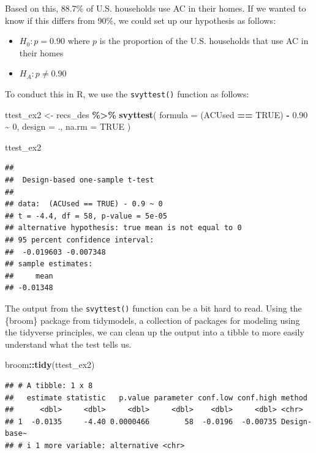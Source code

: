 \documentclass[
]{krantz}
\makeatletter
\newenvironment{Shaded}{\begin{snugshade}}{\end{snugshade}}
\newcommand{\AttributeTok}[1]{\textcolor[rgb]{0.27,0.27,0.27}{#1}}
\newcommand{\ConstantTok}[1]{\textcolor[rgb]{0.37,0.37,0.37}{#1}}
\newcommand{\DecValTok}[1]{\textcolor[rgb]{0.06,0.06,0.06}{#1}}
\newcommand{\FloatTok}[1]{\textcolor[rgb]{0.06,0.06,0.06}{#1}}
\newcommand{\FunctionTok}[1]{\textcolor[rgb]{0.27,0.27,0.27}{\textbf{#1}}}
\newcommand{\NormalTok}[1]{#1}
\newcommand{\OtherTok}[1]{\textcolor[rgb]{0.37,0.37,0.37}{#1}}
\newcommand{\SpecialCharTok}[1]{\textcolor[rgb]{0.43,0.43,0.43}{\textbf{#1}}}
\providecommand{\tightlist}{%
  \setlength{\itemsep}{0pt}\setlength{\parskip}{0pt}}
\newenvironment{kframe}{%
\medskip{}
\setlength{\fboxsep}{.8em}
 \def\at@end@of@kframe{}%
 \ifinner\ifhmode%
  \def\at@end@of@kframe{\end{minipage}}%
  \begin{minipage}{\columnwidth}%
 \fi\fi%
 \def\FrameCommand##1{\hskip\@totalleftmargin \hskip-\fboxsep
 \colorbox{shadecolor}{##1}\hskip-\fboxsep
     \hskip-\linewidth \hskip-\@totalleftmargin \hskip\columnwidth}%
 \MakeFramed {\advance\hsize-\width
   \@totalleftmargin\z@ \linewidth\hsize
   \@setminipage}}%
 {\par\unskip\endMakeFramed%
 \at@end@of@kframe}
\renewenvironment{Shaded}{\begin{kframe}}{\end{kframe}}
\makeatother
\begin{document}
Based on this, 88.7\% of U.S. households use AC in their homes. If we wanted to know if this differs from 90\%, we could set up our hypothesis as follows:

\begin{itemize}
\tightlist
\item
  \(H_0: p = 0.90\) where \(p\) is the proportion of the U.S. households that use AC in their homes
\item
  \(H_A: p \neq 0.90\)
\end{itemize}

To conduct this in R, we use the \texttt{svyttest()} function as follows:

\begin{Shaded}
\begin{Highlighting}[]
\NormalTok{ttest\_ex2 }\OtherTok{\textless{}{-}}\NormalTok{ recs\_des }\SpecialCharTok{\%\textgreater{}\%}
  \FunctionTok{svyttest}\NormalTok{(}
    \AttributeTok{formula =}\NormalTok{ (ACUsed }\SpecialCharTok{==} \ConstantTok{TRUE}\NormalTok{) }\SpecialCharTok{{-}} \FloatTok{0.90} \SpecialCharTok{\textasciitilde{}} \DecValTok{0}\NormalTok{,}
    \AttributeTok{design =}\NormalTok{ .,}
    \AttributeTok{na.rm =} \ConstantTok{TRUE}
\NormalTok{  )}

\NormalTok{ttest\_ex2}
\end{Highlighting}
\end{Shaded}

\begin{verbatim}
## 
##  Design-based one-sample t-test
## 
## data:  (ACUsed == TRUE) - 0.9 ~ 0
## t = -4.4, df = 58, p-value = 5e-05
## alternative hypothesis: true mean is not equal to 0
## 95 percent confidence interval:
##  -0.019603 -0.007348
## sample estimates:
##     mean 
## -0.01348
\end{verbatim}

The output from the \texttt{svyttest()} function can be a bit hard to read. Using the \{broom\} package from tidymodels, a collection of packages for modeling using the tidyverse principles, we can clean up the output into a tibble to more easily understand what the test tells us.

\begin{Shaded}
\begin{Highlighting}[]
\NormalTok{broom}\SpecialCharTok{::}\FunctionTok{tidy}\NormalTok{(ttest\_ex2)}
\end{Highlighting}
\end{Shaded}

\begin{verbatim}
## # A tibble: 1 x 8
##   estimate statistic   p.value parameter conf.low conf.high method      
##      <dbl>     <dbl>     <dbl>     <dbl>    <dbl>     <dbl> <chr>       
## 1  -0.0135     -4.40 0.0000466        58  -0.0196  -0.00735 Design-base~
## # i 1 more variable: alternative <chr>
\end{verbatim}
\end{document}
